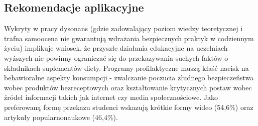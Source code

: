 \subsection{Rekomendacje aplikacyjne}

Wykryty w pracy dysonans (gdzie zadowalający poziom wiedzy teoretycznej i trafna samoocena nie gwarantują wdrażania bezpiecznych praktyk w codziennym życiu) implikuje wniosek, że przyszłe działania edukacyjne na uczelniach wyższych nie powinny ograniczać się do przekazywania suchych faktów o składnikach suplementów diety. Programy profilaktyczne muszą kłaść nacisk na behawioralne aspekty konsumpcji - zwalczanie poczucia złudnego bezpieczeństwa wobec produktów bezreceptowych oraz kształtowanie krytycznych postaw wobec źródeł informacji takich jak internet czy media społecznościowe. Jako preferowaną formę przekazu studenci wskazują krótkie formy wideo (54,6\%) oraz artykuły popularnonaukowe (46,4\%).

